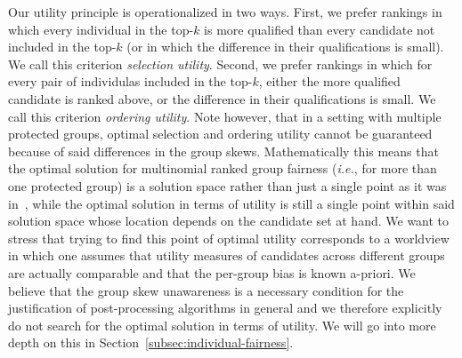 Our utility principle is operationalized in two ways.
%
First, we prefer rankings in which every individual in the top-$k$ is more qualified than every candidate not included in the top-$k$ (or in which the difference in their qualifications is small). We call this criterion \emph{selection utility}.
%
Second, we prefer rankings in which for every pair of individulas included in the top-$k$, either the more qualified candidate is ranked above, or the difference in their qualifications is small. We call this criterion \emph{ordering utility}.
%
Note however, that in a setting with multiple protected groups, optimal selection and ordering utility cannot be guaranteed because of said differences in the group skews.
%
Mathematically this means that the optimal solution for multinomial ranked group fairness ({\em i.e.}, for more than one protected group) is a solution space rather than just a single point as it was in~\cite{zehlike2017fair}, while the optimal solution in terms of utility is still a single point within said solution space whose location depends on the candidate set at hand.
%
We want to stress that trying to find this point of optimal utility corresponds to a worldview in which one assumes that utility measures of candidates across different groups are actually comparable and that the per-group bias is known a-priori.
%
We believe that the group skew unawareness is a necessary condition for the justification of post-processing algorithms in general and we therefore explicitly do not search for the optimal solution in terms of utility.
%
We will go into more depth on this in Section~\ref{subsec:individual-fairness}.
%


